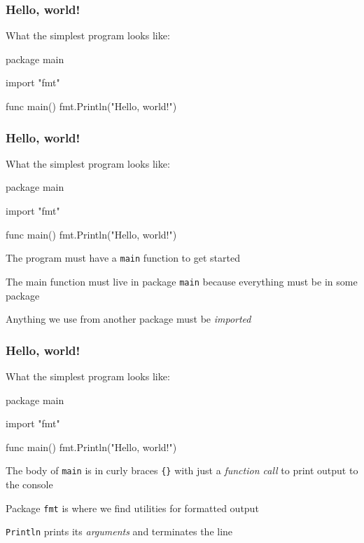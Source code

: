 \documentclass[handout,compress,t,11pt]{beamer}
\begin{document}
\begin{frame}[fragile]
\frametitle{Hello, world!}
What the simplest program looks like:
\begin{golang}
package main

import "fmt"

func main() {
    fmt.Println("Hello, world!")
}
\end{golang}
\end{frame}

\begin{frame}[fragile]
\frametitle{Hello, world!}
What the simplest program looks like:
\begin{golang}
package main

import "fmt"

func main() {
    fmt.Println("Hello, world!")
}
\end{golang}
    \vspace{0.5\baselineskip}
The program must have a \verb|main| function to get started \par
    \vspace{0.5\baselineskip}
The main function must live in package \verb|main| because everything
must be in some package \par
    \vspace{0.5\baselineskip}
Anything we use from another package must be {\em imported}
\end{frame}

\begin{frame}[fragile]
\frametitle{Hello, world!}
What the simplest program looks like:
\begin{golang}
package main

import "fmt"

func main() {
    fmt.Println("Hello, world!")
}
\end{golang}
    \vspace{0.5\baselineskip}
The body of \verb|main| is in curly braces \verb|{}| with just a
{\em function call} to print output to the console \par
    \vspace{0.5\baselineskip}
Package \verb|fmt| is where we find utilities for formatted output \par
    \vspace{0.5\baselineskip}
\verb|Println| prints its {\em arguments} and terminates the line
\end{frame}
\end{document}

